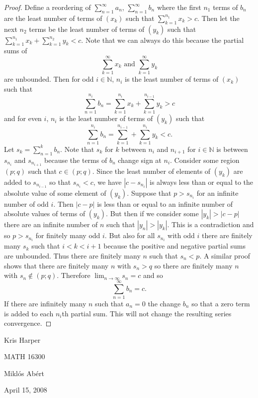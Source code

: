 \documentclass{article}
\begin{document}
\begin{flushleft}
\begin{proof}
Define a reordering of $\sum_{n=1}^{\infty} a_n$, $\sum_{n=1}^{\infty} b_n$ where the first $n_1$ terms of $b_n$ are the least number of terms of $(x_k)$ such that $\sum_{k=1}^{n_1} x_k > c$. Then let the next $n_2$ terms be the least number of terms of $(y_k)$ such that $\sum_{k=1}^{n_1} x_k + \sum_{k=1}^{n_2} y_k < c$. Note that we can always do this because the partial sums of
\[
\sum_{k=1}^{\infty} x_k \text{ and } \sum_{k=1}^{\infty} y_k
\]
are unbounded. Then for odd $i \in \mathbb{N}$, $n_i$ is the least number of terms of $(x_k)$ such that
\[
\sum_{n=1}^{n_i} b_n = \sum_{k=1}^{n_i} x_k + \sum_{k=1}^{n_{i-1}} y_k > c
\]
and for even $i$, $n_i$ is the least number of terms of $(y_k)$ such that
\[
\sum_{n=1}^{n_i} b_n = \sum_{k=1}^{n_{i-1}} + \sum_{k=1}^{n_i} y_k < c.
\]
Let $s_k = \sum_{n=1}^{k} b_n$. Note that $s_k$ for $k$ between $n_i$ and $n_{i+1}$ for $i \in \mathbb{N}$ is between $s_{n_i}$ and $s_{n_{i+1}}$ because the terms of $b_n$ change sign at $n_i$. Consider some region $(p;q)$ such that $c \in (p;q)$. Since the least number of elements of $(y_k)$ are added to $s_{n_{i-1}}$ so that $s_{n_i} < c$, we have $|c - s_{n_i}|$ is always less than or equal to the absolute value of some element of $(y_k)$. Suppose that $p > s_{n_i}$ for an infinite number of odd $i$. Then $|c-p|$ is less than or equal to an infinite number of absolute values of terms of $(y_k)$. But then if we consider some $|y_k| > |c-p|$ there are an infinite number of $n$ such that $|y_n| > |y_k|$. This is a contradiction and so $p > s_{n_i}$ for finitely many odd $i$. But also for all $s_{n_i}$ with odd $i$ there are finitely many $s_k$ such that $i < k < i+1$ because the positive and negative partial sums are unbounded. Thus there are finitely many $n$ such that $s_n < p$. A similar proof shows that there are finitely many $n$ with $s_n > q$ so there are finitely many $n$ with $s_n \notin (p;q)$. Therefore $\lim_{n \rightarrow \infty} s_n = c$ and so
\[
\sum_{n=1}^{\infty} b_n = c.
\]
If there are infinitely many $n$ such that $a_n=0$ the change $b_n$ so that a zero term is added to each $n_i$th partial sum. This will not change the resulting series convergence.
\end{proof}

\end{flushleft}

\newpage

\begin{flushright}
Kris Harper

MATH 16300

Mikl\'{o}s Ab\'{e}rt

April 15, 2008
\end{flushright}
\end{document}

